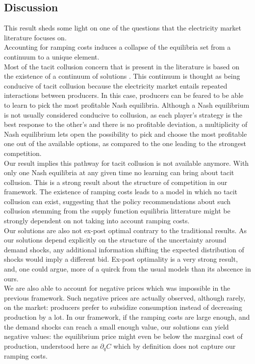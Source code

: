 \subsection{Discussion}

This result sheds some light on one of the questions that the electricity market literature focuses on. \\

Accounting for ramping costs induces a collapse of the equilibria set from a continuum to a unique element. \\

Most of the tacit collusion concern that is present in the literature is based on the existence of a continuum of solutions \cite{bolle1992supply}. This continuum is thought as being conducive of tacit collusion because the electricity market entails repeated interactions between producers. In this case, producers can be feared to be able to learn to pick the most profitable Nash equilibria. Although a Nash equilibrium is not usually considered conducive to collusion, as each player's strategy is the best response to the other's and there is no profitable deviation, a multiplicity of Nash equilibrium lets open the possibility to pick and choose the most profitable one out of the available options, as compared to the one leading to the strongest competition.\\

Our result implies this pathway for tacit collusion is not available anymore. With only one Nash equilibria at any given time no learning can bring about tacit collusion. This is a strong result about the structure of competition in our framework. The existence of ramping costs leads to a model in which no tacit collusion can exist, suggesting that the policy recommendations about such collusion stemming from the supply function equilibria litterature might be strongly dependent on not taking into account ramping costs.\\

Our solutions are also not ex-post optimal contrary to the traditional results. As our solutions depend explicitly on the structure of the uncertainty around demand shocks, any additional information shifting the expected distribution of shocks would imply a different bid. Ex-post optimality is a very strong result, and, one could argue, more of a quirck from the usual models than its abscence in ours.\\

We are also able to account for negative prices which was impossible in the previous framework. Such negative prices are actually observed, although rarely, on the market: producers prefer to subsidize consumption instead of decreasing production by a lot. In our framework, if the ramping costs are large enough, and the demand shocks can reach a small enough value, our solutions can yield negative values: the equilibrium price might even be below the marginal cost of production, understood here as $\partial_q C$ which by definition does not capture our ramping costs.\\

